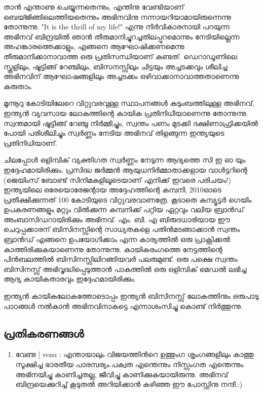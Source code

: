 \vskip 2pt

താന്‍ എന്താണു ചെയ്യുന്നതെന്നും, എന്തിനു വേണ്ടിയാണ് ബെയ്ജിങ്ങിലെത്തിയതെന്നും അഭിനവിനു നന്നായറിയാമായിരുന്നെന്നു തോന്നുന്നു. "It is the thrill of my life!" എന്നു നിര്‍വികാരനായി പറയുന്ന അഭിനവ് ബിന്ദ്രയില്‍ ഞാന്‍ തീരുമാനിച്ചുറച്ചതിലപ്പുറമൊന്നും നേടിയില്ലെന്ന അഹങ്കാരത്തെക്കാളും, എങ്ങനെ ആഘോഷിക്കണമെന്നു തീരുമാനിക്കാനാവാത്ത ഒരു പ്രതിസന്ധിയാണ് കണ്ടത്. ഡെറാഡൂണിലെ സ്കൂളിലും, ഷൂട്ടിങ്ങ് റേഞ്ചിലും, ബിസനസ്സിലും ചിട്ടയും അച്ചടക്കവും ശീലിച്ച അഭിനവിന് ആഘോഷങ്ങളിലും അച്ചടക്കം ഒഴിവാക്കാനാവാത്തതാണെന്നു കരുതാം.

മൂന്നൂറു കോടിയിലേറെ വിറ്റുവരവുള്ള സ്ഥാപനങ്ങള്‍ കുടുംബത്തിലുള്ള അഭിനവ്, ഇന്ത്യന്‍ വ്യവസായ ലോകത്തിന്റെ കായിക പ്രതിനിധീയാണെന്നു തോന്നുന്നു. സ്വന്തമായി ഷൂട്ടിങ്ങ് റേഞ്ചു നിര്‍മ്മിച്ചും, സ്വന്തം പണം മുടക്കി ദക്ഷിണാഫ്രിക്കയില്‍ പോയി പരിശീലിച്ചും സ്വര്‍ണ്ണം നേടിയ അഭിനവ് തിളങ്ങുന്ന ഇന്ത്യയുടെ പ്രതിനിധിയാണ്.

ചിലപ്പോള്‍ ഒളിമ്പിക് വ്യക്തിഗത സ്വര്‍ണ്ണം നേടുന്ന ആദ്യത്തെ സി ഇ ഓ യും ഇദ്ദേഹമായിരിക്കും. പ്രസിദ്ധ ജര്‍മ്മന്‍ ആയുധനിര്‍മ്മാതാക്കളായ വാള്‍ട്ടറിന്റെ (ജെയിംസ് ബോണ്ട് സിനിമകളിലൂടെയാണ് എനിക്ക് ഇവരെ പരിചയം!) ഇന്ത്യയിലെ ഒരേയൊരേജന്റായ അദ്ദേഹത്തിന്റെ കമ്പനി, 2010ഓടെ പ്രതീക്ഷിക്കുന്നത് 100 കോടിയുടെ വിറ്റുവരവാണത്രേ. കൂടാതെ കമ്പ്യൂട്ടര്‍ ഗെയിം ഉപകരണങ്ങളും മറ്റും വില്‍ക്കുന്ന കമ്പനിക്ക് പറ്റിയ ഏറ്റവും വലിയ ബ്രാന്‍ഡ് അംബാസിഡറായിരിക്കും അഭിനവ്. എം. ബി. എ ബിരുദധാരിയായ ഈ ചെറുപ്പക്കാരന് ബിസിനസ്സിന്റെ സാധ്യതകളെ പതിന്‍മടങ്ങാക്കാന്‍ സ്വന്തം ബ്രാന്‍ഡ് എങ്ങനെ ഉപയോഗിക്കാം എന്ന കാര്യത്തില്‍ ഒരു പ്രാക്റ്റിക്കല്‍ കാത്തിരിക്കുകയാണെന്നു തോന്നുന്നു. കായികരംഗത്തെ നേട്ടത്തിന്റെ പിന്‍ബലത്തില്‍ ബിസിനസ്സിലിറങ്ങിയവര്‍ പലരുമുണ്ട്. ഒരു പക്ഷെ സ്വന്തം ബിസിനസ്സ് അഭിവൃദ്ധിപ്പെടുത്താന്‍ പാകത്തില്‍ ഒരു ഒളിമ്പിക് മെഡല്‍ ലഭിച്ച ആദ്യ കായികതാരവും ഇദ്ദേഹമായിരിക്കും.

ഇന്ത്യന്‍ കായികലോകത്തോടൊപ്പം ഇന്ത്യന്‍ ബിസിനസ്സ് ലോകത്തിനും ഒരുപാടു പാഠങ്ങള്‍ നല്‍കാന്‍ അഭിനവിനാകട്ടെ എന്നാശംസിച്ചു കൊണ്ട് നിര്‍ത്തുന്നു.

\subsection*{പ്രതികരണങ്ങള്‍}
\begin{enumerate}
\item{വേണു | venu : }
എന്തായാലും വിജയത്തിന്‍റെ ഉത്തുംഗ ശൃംഗങ്ങളീലും കാത്തു സൂക്ഷിച്ച ഭാരതീയ പാരമ്പര്യം.പക്വത എന്തെന്നും നിസ്സംഗത എന്തെന്നും അഭിനയിച്ചു കാണിച്ചതല്ല, ജീവിച്ചു കാണിക്കുകയായിരുന്നു. അഭിനവ് ബിന്ദ്രയെക്കുറിച്ച് കൂടുതല്‍ അറിയിക്കാന്‍ കഴിഞ്ഞ ഈ പോസ്റ്റിനു നന്ദി.:)

\end{enumerate}

\newpage
